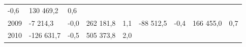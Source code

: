 \begin{longtable}[]{@{}lllllllll@{}}
\begin{minipage}[t]{0.06\columnwidth}
-0,6\strut
\end{minipage} & \begin{minipage}[t]{0.08\columnwidth}\raggedright
130 469,2\strut
\end{minipage} & \begin{minipage}[t]{0.06\columnwidth}\raggedright
0,6\strut
\end{minipage}\tabularnewline
\begin{minipage}[t]{0.05\columnwidth}\raggedright
2009\strut
\end{minipage} & \begin{minipage}[t]{0.10\columnwidth}\raggedright
-7 214,3\strut
\end{minipage} & \begin{minipage}[t]{0.06\columnwidth}\raggedright
-0,0\strut
\end{minipage} & \begin{minipage}[t]{0.17\columnwidth}\raggedright
262 181,8\strut
\end{minipage} & \begin{minipage}[t]{0.06\columnwidth}\raggedright
1,1\strut
\end{minipage} & \begin{minipage}[t]{0.12\columnwidth}\raggedright
-88 512,5\strut
\end{minipage} & \begin{minipage}[t]{0.06\columnwidth}\raggedright
-0,4\strut
\end{minipage} & \begin{minipage}[t]{0.08\columnwidth}\raggedright
166 455,0\strut
\end{minipage} & \begin{minipage}[t]{0.06\columnwidth}\raggedright
0,7\strut
\end{minipage}\tabularnewline
\begin{minipage}[t]{0.05\columnwidth}\raggedright
2010\strut
\end{minipage} & \begin{minipage}[t]{0.10\columnwidth}\raggedright
-126 631,7\strut
\end{minipage} & \begin{minipage}[t]{0.06\columnwidth}\raggedright
-0,5\strut
\end{minipage} & \begin{minipage}[t]{0.17\columnwidth}\raggedright
505 373,8\strut
\end{minipage} & \begin{minipage}[t]{0.06\columnwidth}\raggedright
2,0\strut
\end{minipage} & \begin{minipage}[t]{0.12\columnwidth}\raggedright

\end{minipage}
\end{longtable}
